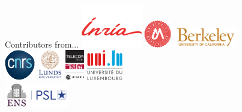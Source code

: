 \documentclass[unknownkeysallowed]{beamer}
\begin{document}
\begin{frame}{Contributors from...}
    \centering
    \includegraphics[width=100px]{sharedimages/logo_inria_horiz.pdf} \hspace{1mm}
    \includegraphics[height=45px]{sharedimages/um_logo.pdf} \hspace{1mm}
    \includegraphics[height=35px]{sharedimages/logo_berkeley.png} \hspace{1mm}
    \\[7mm]
    \includegraphics[height=50px]{sharedimages/logo_cnrs.pdf} \hspace{5mm}
    \includegraphics[height=50px]{sharedimages/logo_lund} \hspace{5mm}
    \includegraphics[height=50px]{sharedimages/logo_telecom.pdf} \hspace{5mm}
    \includegraphics[height=50px]{sharedimages/logo_univ_luxembourg.pdf} \\[4mm]
    \includegraphics[height=40px]{sharedimages/logo_ens.png}
\end{frame}
\end{document}
